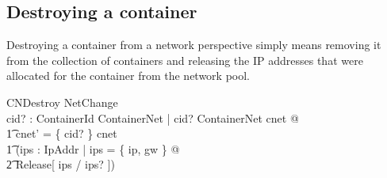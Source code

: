 \documentclass[a4paper,twoside,12pt]{article}
\begin{document}
\subsection{Destroying a container}
Destroying a container from a network perspective simply means removing it from the collection of containers and releasing the IP addresses that were allocated for the container from the network pool.
\begin{schema}{CNDestroy}
NetChange \\
cid? : ContainerId
\where
\exists ContainerNet | cid? \mapsto \theta ContainerNet \in cnet @ \\
	\t1 cnet' = \{ cid? \} \ndres cnet \land \\
	\t1 (\exists ips : \power IpAddr | ips = \{ ip, gw \} @ \\
		\t2 Release[ ips / ips? ])
\end{schema}


\clearpage

\appendix





\end{document}
